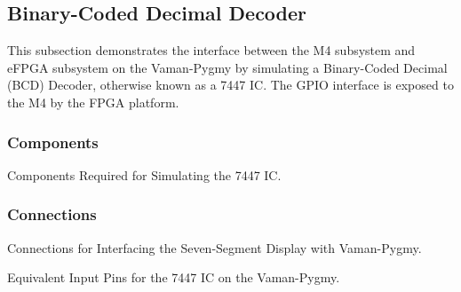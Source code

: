 \subsection{Binary-Coded Decimal Decoder}
This subsection demonstrates the interface between the M4 subsystem and eFPGA
subsystem on the Vaman-Pygmy by simulating a Binary-Coded Decimal (BCD) Decoder,
otherwise known as a 7447 IC. The GPIO interface is exposed to the M4 by the
FPGA platform.

\subsubsection{Components}
\begin{table}[!ht]
    \centering
    
    \caption{Components Required for Simulating the 7447 IC.}
    \label{tab:m4-fpga-bcd-components}
\end{table}

\subsubsection{Connections}
\begin{table}[!ht]
    \centering
    
    \caption{Connections for Interfacing the Seven-Segment Display with Vaman-Pygmy.}
    \label{tab:m4-fpga-bcd-sevenseg-connections}
\end{table}

\begin{table}[!ht]
    \centering
    
    \caption{Equivalent Input Pins for the 7447 IC on the Vaman-Pygmy.}
    \label{tab:m4-fpga-bcd-bcd-connections}
\end{table}

